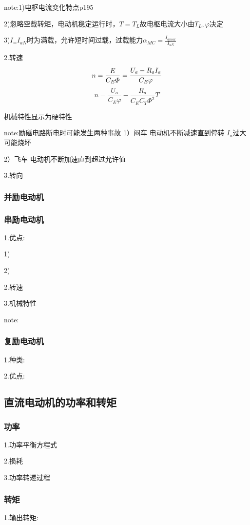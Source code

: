 \documentclass[11pt,twoside,a4paper]{ctexart}
\begin{document}
    note:1)电枢电流变化特点p195

    2)忽略空载转矩，电动机稳定运行时，$T = T_L$故电枢电流大小由$T_L,\varphi $决定

    3)$I_ = I_{aN}$时为满载，允许短时间过载，过载能力$\alpha _{MC} = \frac{I_{amax}}{I_{aN}}$

    2.转速
    \[n = \frac{E}{C_E\varPhi } = \cfrac[]{U_a - R_aI_a}{C_E\varphi }\]
    \[n = \frac{U_a}{C_E\varphi} - \frac{R_a}{C_EC_T\varPhi ^2}T\]

    机械特性显示为硬特性

    note:励磁电路断电时可能发生两种事故
    1）闷车 电动机不断减速直到停转 $I_a$过大可能烧坏

    2）飞车 电动机不断加速直到超过允许值
    
    3.转向
    \subsubsection{并励电动机}
    \subsubsection{串励电动机}
    1.优点:
    \begin{minipage}[t]{0.9\linewidth}
        1)

        2)
    \end{minipage}

    2.转速
    \[\]

    3.机械特性

    note:
    \subsubsection{复励电动机}
    1.种类:

    2.优点:

    \subsection{直流电动机的功率和转矩}
    \subsubsection{功率}
    1.功率平衡方程式

    2.损耗

    3.功率转递过程

    \subsubsection{转矩}
    1.输出转矩:
\end{document}
